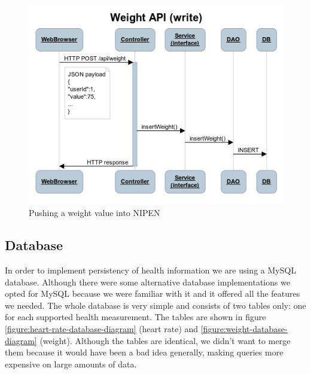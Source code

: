 \begin{figure}[h]
\centering
\includegraphics[scale=0.8]{../Figures/seqw.png}
\caption{Pushing a weight value into NIPEN}
\label{figure:seqw}
\end{figure}


\subsection{Database}

In order to implement persistency of health information we are using a MySQL database.
Although there were some alternative database implementations we opted for MySQL
because we were familiar with it and it offered all the features we needed.
The whole database is very simple and consists of two tables only: one for each supported health measurement.
The tables are shown in figure \ref{figure:heart-rate-database-diagram} (heart rate)
and \ref{figure:weight-database-diagram} (weight).
Although the tables are identical, we didn't want to merge them because it would 
have been a bad idea generally, making queries more expensive on large amounts of data.


